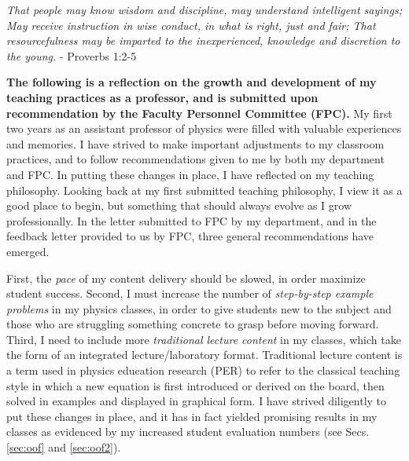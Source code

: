 \documentclass[../../main.tex]{subfiles}
\begin{document}
\epigraph{\textit{That people may know wisdom and discipline, may understand intelligent sayings; May receive instruction in wise conduct, in what is right, just and fair; That resourcefulness may be imparted to the inexperienced, knowledge and discretion to the young.} - Proverbs 1:2-5}{}

\textbf{The following is a reflection on the growth and development of my teaching practices as a professor, and is submitted upon recommendation by the Faculty Personnel Committee (FPC).}  My first two years as an assistant professor of physics were filled with valuable experiences and memories.  I have strived to make important adjustments to my classroom practices, and to follow recommendations given to me by both my department and FPC.  In putting these changes in place, I have reflected on my teaching philosophy.  Looking back at my first submitted teaching philosophy, I view it as a good place to begin, but something that should always evolve as I grow professionally.  In the letter submitted to FPC by my department, and in the feedback letter provided to us by FPC, three general recommendations have emerged. \\ \hspace{0.1cm}

First, the \textit{pace} of my content delivery should be slowed, in order maximize student success.  Second, I must increase the number of \textit{step-by-step example problems} in my physics classes, in order to give students new to the subject and those who are struggling something concrete to grasp before moving forward.  Third, I need to include more \textit{traditional lecture content} in my classes, which take the form of an integrated lecture/laboratory format.  Traditional lecture content is a term used in physics education research (PER) to refer to the classical teaching style in which a new equation is first introduced or derived on the board, then solved in examples and displayed in graphical form.  I have strived diligently to put these changes in place, and it has in fact yielded promising results in my classes as evidenced by my increased student evaluation numbers (see Secs. \ref{sec:oof} and \ref{sec:oof2}). \\ \hspace{0.1cm}
\end{document}
